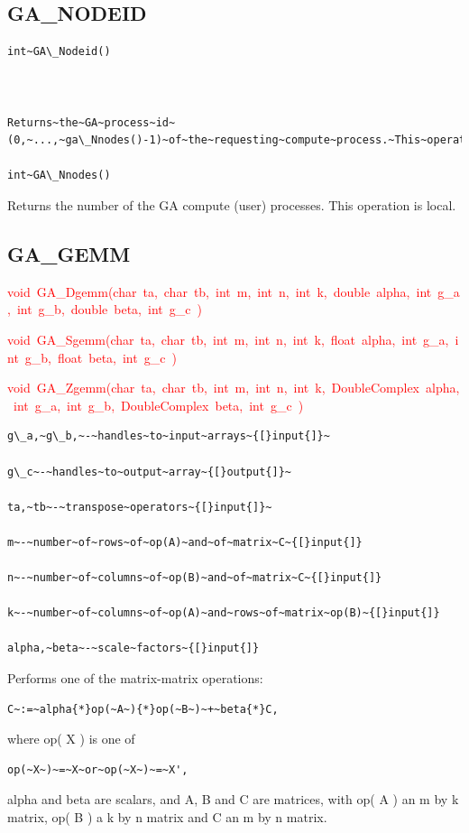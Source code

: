 \subsection*{GA\_NODEID}
\begin{verbatim}
int~GA\_Nodeid()



Returns~the~GA~process~id~(0,~...,~ga\_Nnodes()-1)~of~the~requesting~compute~process.~This~operation~is~local.~GA\_NNODES

int~GA\_Nnodes()
\end{verbatim}
Returns the number of the GA compute (user) processes. This operation
is local. 


\subsection*{GA\_GEMM}
\textcolor{red}{void~GA\_Dgemm(char~ta,~char~tb,~int~m,~int~n,~int~k,~double~alpha,~int~g\_a,~int~g\_b,~double~beta,~int~g\_c~)~}

\textcolor{red}{void~GA\_Sgemm(char~ta,~char~tb,~int~m,~int~n,~int~k,~float~alpha,~int~g\_a,~int~g\_b,~float~beta,~int~g\_c~)~}

\textcolor{red}{void~GA\_Zgemm(char~ta,~char~tb,~int~m,~int~n,~int~k,~DoubleComplex~alpha,~int~g\_a,~int~g\_b,~DoubleComplex~beta,~int~g\_c~)}
\begin{verbatim}
g\_a,~g\_b,~-~handles~to~input~arrays~{[}input{]}~

g\_c~-~handles~to~output~array~{[}output{]}~

ta,~tb~-~transpose~operators~{[}input{]}~

m~-~number~of~rows~of~op(A)~and~of~matrix~C~{[}input{]}

n~-~number~of~columns~of~op(B)~and~of~matrix~C~{[}input{]}

k~-~number~of~columns~of~op(A)~and~rows~of~matrix~op(B)~{[}input{]}

alpha,~beta~-~scale~factors~{[}input{]}
\end{verbatim}
Performs one of the matrix-matrix operations:
\begin{verbatim}
C~:=~alpha{*}op(~A~){*}op(~B~)~+~beta{*}C,
\end{verbatim}
where op( X ) is one of
\begin{verbatim}
op(~X~)~=~X~or~op(~X~)~=~X',
\end{verbatim}
alpha and beta are scalars, and A, B and C are matrices, with op(
A ) an m by k matrix, op( B ) a k by n matrix and C an m by n matrix.


